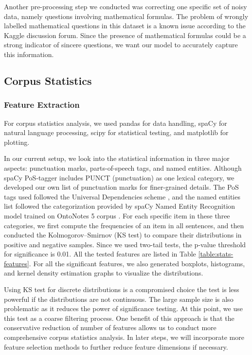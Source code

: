 \documentclass[12pt]{diazessay} %
\begin{document}
Another pre-processing step we conducted was correcting one specific set of noisy data, namely questions involving mathematical formulas. The problem of wrongly labelled mathematical questions in this dataset is a known issue according to the Kaggle discussion forum. Since the presence of mathematical formulas could be a strong indicator of sincere questions, we want our model to accurately capture this information.

\subsection{Corpus Statistics} \label{corpus-stats}

\subsubsection{Feature Extraction}

For corpus statistics analysis, we used pandas for data handling, spaCy for natural language processing, scipy for statistical testing, and matplotlib for plotting. 

In our current setup, we look into the statistical information in three major aspects: punctuation marks, parts-of-speech tags, and named entities. Although spaCy PoS-tagger includes PUNCT (punctuation) as one lexical category, we developed our own list of punctuation marks for finer-grained details. The PoS tags used followed the Universal Dependencies scheme \citep{pos-tag}, and the named entities list followed the categorization provided by spaCy Named Entity Recognition model trained on OntoNotes 5 corpus \citep{spacy-named-entity}. For each specific item in these three categories, we first compute the frequencies of an item in all sentences, and then conducted the Kolmogorov–Smirnov (KS test) to compare their distributions in positive and negative samples. Since we used two-tail tests, the p-value threshold for significance is 0.01. All the tested features are listed in Table \ref{table:stats-features}. For all the significant features, we also generated boxplots, histograms, and kernel density estimation graphs to visualize the distributions. 

Using KS test for discrete distributions is a compromised choice the test is less powerful if the distributions are not continuous. The large sample size is also problematic as it reduces the power of significance testing. At this point, we use this test as a coarse filtering process. One benefit of this approach is that the conservative reduction of number of features allows us to conduct more comprehensive corpus statistics analysis. In later steps, we will incorporate more feature selection methods to further reduce feature dimensions if necessary. 
\end{document}
